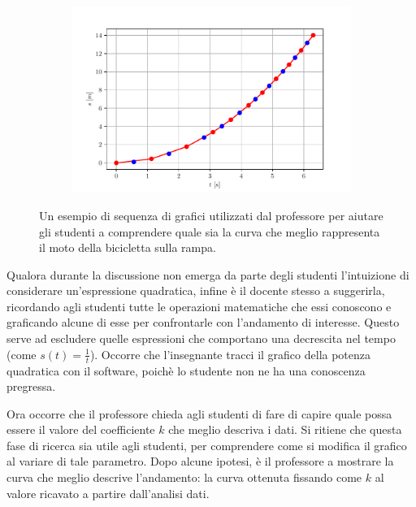 \documentclass{report} \usepackage[T1]{fontenc} \usepackage[italian]{babel}
\begin{document}
\begin{figure}[H]
\begin{subfigure}[b]{0.49\textwidth}
  \end{subfigure}
  \begin{subfigure}[b]{0.49\textwidth}
  \includegraphics[width=\textwidth]{s-t_parabola6}
  \end{subfigure}
  \caption{
           Un esempio di sequenza di grafici utilizzati
           dal professore per aiutare gli studenti a
           comprendere quale sia la curva che meglio
           rappresenta il moto della bicicletta sulla
           rampa.
          }
  \label{fig:parabola_sequence}
\end{figure}

Qualora durante la discussione non emerga da parte degli studenti
l’intuizione di considerare un'espressione quadratica, infine è il docente
stesso a suggerirla, ricordando agli studenti tutte le operazioni matematiche
che essi conoscono e graficando alcune di esse per confrontarle con
l'andamento di interesse. Questo serve ad escludere quelle espressioni
che comportano una decrescita nel tempo (come $s(t) = \frac{1}{t}$).
Occorre che l’insegnante tracci il grafico della potenza
quadratica con il software, poichè lo studente non ne ha una conoscenza
pregressa.

Ora occorre che il professore chieda agli studenti di fare di capire quale
possa essere il
valore del coefficiente $k$ che meglio descriva i dati. Si ritiene che questa
fase di ricerca sia utile agli studenti, per comprendere come si modifica il
grafico al variare di tale parametro. Dopo alcune ipotesi, è il professore a
mostrare la curva che meglio descrive l’andamento: la curva ottenuta fissando
come $k$ al valore ricavato a partire dall’analisi dati.
\end{document}
